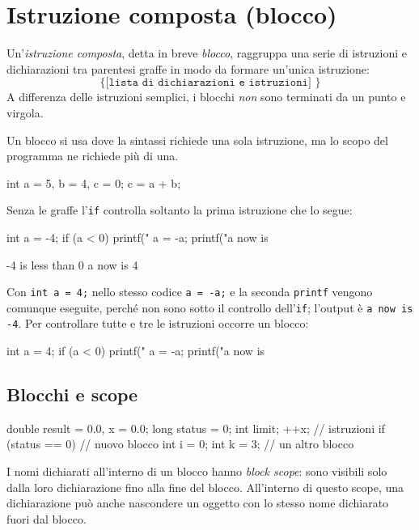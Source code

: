 \documentclass[11pt,a4paper]{article}
\begin{document}
\section{Istruzione composta (blocco)}

Un'\emph{istruzione composta}, detta in breve \emph{blocco}, raggruppa una serie di istruzioni e dichiarazioni tra parentesi graffe in modo da formare un'unica istruzione:
\[
\texttt{\{ [lista di dichiarazioni e istruzioni] \}}
\]
A differenza delle istruzioni semplici, i blocchi \emph{non} sono terminati da un punto e virgola.

Un blocco si usa dove la sintassi richiede una sola istruzione, ma lo scopo del programma ne richiede più di una.
\begin{codice}
{
    int a = 5, b = 4, c = 0;
    c = a + b;
}
\end{codice}

\begin{esempio}
Senza le graffe l'\lstinline|if| controlla soltanto la prima istruzione che lo segue:
\begin{codice}
int a = -4;
if (a < 0)
    printf("%
    a = -a;
    printf("a now is %
\end{codice}
\begin{risultato}
-4 is less than 0 a now is 4
\end{risultato}
Con \lstinline|int a = 4;| nello stesso codice \lstinline|a = -a;| e la seconda \lstinline|printf| vengono comunque eseguite, perché non sono sotto il controllo dell'\lstinline|if|; l'output è \texttt{a now is -4}. Per controllare tutte e tre le istruzioni occorre un blocco:
\begin{codice}
int a = 4;
if (a < 0) {
    printf("%
    a = -a;
    printf("a now is %
}
\end{codice}
\end{esempio}

\subsection{Blocchi e scope}

\begin{codice}
{   double result = 0.0, x = 0.0;
    long status = 0;
    int limit;
    ++x;                    // istruzioni
    if (status == 0)
    {                       // nuovo blocco
        int i = 0;
        { int k = 3; }      // un altro blocco
    }
}
\end{codice}
I nomi dichiarati all'interno di un blocco hanno \emph{block scope}: sono visibili solo dalla loro dichiarazione fino alla fine del blocco. All'interno di questo scope, una dichiarazione può anche nascondere un oggetto con lo stesso nome dichiarato fuori dal blocco.
\end{document}
